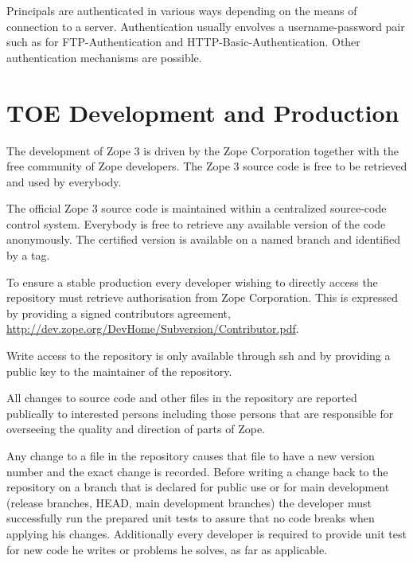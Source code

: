 \documentclass[12pt,english]{scrbook}
\begin{document}
Principals are authenticated in various ways depending on the means of
connection to a server.  Authentication usually envolves a username-password
pair such as for FTP-Authentication and HTTP-Basic-Authentication.  Other
authentication mechanisms are possible.





\section{TOE Development and Production}

The development of Zope 3 is driven by the Zope Corporation together with the
free community of Zope developers. The Zope 3 source code is free to be
retrieved and used by everybody.

The official Zope 3 source code is maintained within a centralized source-code
control system.  Everybody is free to retrieve any available version of the
code anonymously. The certified version is available on a named branch and
identified by a tag.

To ensure a stable production every developer wishing to directly access the
repository must retrieve authorisation from Zope Corporation. This is
expressed by providing a signed contributors agreement,
\href{http://dev.zope.org/DevHome/Subversion/Contributor.pdf}{http://dev.zope.org/DevHome/Subversion/Contributor.pdf}.

Write access to the repository is only available through ssh and by providing
a public key to the maintainer of the repository.

All changes to source code and other files in the repository are reported
publically to interested persons including those persons that are responsible
for overseeing the quality and direction of parts of Zope.

Any change to a file in the repository causes that file to have a new version
number and the exact change is recorded. Before writing a change back to the
repository on a branch that is declared for public use or for main development
(release branches, HEAD, main development branches) the developer must
successfully run the prepared unit tests to assure that no code breaks when
applying his changes. Additionally every developer is required to provide unit
test for new code he writes or problems he solves, as far as applicable.


\end{document}
